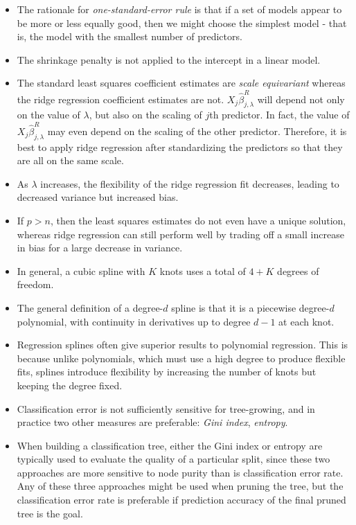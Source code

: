 \documentclass{article}
\begin{document}
\begin{itemize}
    \item The rationale for \textit{one-standard-error rule} is that if a set of models appear to be more or less equally good, then we might choose the simplest model - that is, the model with the smallest number of predictors.
    \item The shrinkage penalty is not applied to the intercept in a linear model.
    \item The standard least squares coefficient estimates are \textit{scale equivariant} whereas the ridge regression coefficient estimates are not. $X_j\hat{\beta}_{j,\lambda}^{R}$ will depend not only on the value of $\lambda$, but also on the scaling of $j$th predictor. In fact, the value of $X_j\hat{\beta}_{j,\lambda}^{R}$ may even depend on the scaling of the other predictor. Therefore, it is best to apply ridge regression after standardizing the predictors so that they are all on the same scale.
    \item As $\lambda$ increases, the flexibility of the ridge regression fit decreases, leading to decreased variance but increased bias.
    \item If $p>n$, then the least squares estimates do not even have a unique solution, whereas ridge regression can still perform well by trading off a small increase in bias for a large decrease in variance.
    \item In general, a cubic spline with $K$ knots uses a total of $4+K$ degrees of freedom.
    \item The general definition of a degree-$d$ spline is that it is a piecewise degree-$d$ polynomial, with continuity in derivatives up to degree $d-1$ at each knot.
    \item Regression splines often give superior results to polynomial regression. This is because unlike polynomials, which must use a high degree to produce flexible fits, splines introduce flexibility by increasing the number of knots but keeping the degree fixed.
    \item Classification error is not sufficiently sensitive for tree-growing, and in practice two other measures are preferable: \textit{Gini index}, \textit{entropy}. 
    \item When building a classification tree, either the Gini index or entropy are typically used to evaluate the quality of a particular split, since these two approaches are more sensitive to node purity than is classification error rate. Any of these three approaches might be used when pruning the tree, but the classification error rate is preferable if prediction accuracy of the final pruned tree is the goal.

\end{itemize}
\end{document}
